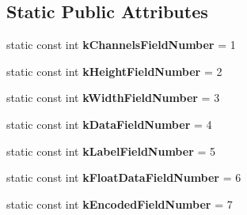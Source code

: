 \subsection*{Static Public Attributes}
\begin{DoxyCompactItemize}
\item 
\mbox{\label{classcaffe_1_1_datum_a29f5e8c5cb95724fb1acc9e653f9f801}} 
static const int {\bfseries k\+Channels\+Field\+Number} = 1
\item 
\mbox{\label{classcaffe_1_1_datum_a583d41a34b284174f56265bee590af02}} 
static const int {\bfseries k\+Height\+Field\+Number} = 2
\item 
\mbox{\label{classcaffe_1_1_datum_af711bbda0e62159d417a025955c80b19}} 
static const int {\bfseries k\+Width\+Field\+Number} = 3
\item 
\mbox{\label{classcaffe_1_1_datum_a9e15be20d26be0617c328e4bf1194deb}} 
static const int {\bfseries k\+Data\+Field\+Number} = 4
\item 
\mbox{\label{classcaffe_1_1_datum_ad2eb7414a6bd7b5c286fcdae87d55edd}} 
static const int {\bfseries k\+Label\+Field\+Number} = 5
\item 
\mbox{\label{classcaffe_1_1_datum_a230ea1f49b7e0383784fd4a0bc73dd78}} 
static const int {\bfseries k\+Float\+Data\+Field\+Number} = 6
\item 
\mbox{\label{classcaffe_1_1_datum_ab9447cc8853964074d3d7a9b10d031fc}} 
static const int {\bfseries k\+Encoded\+Field\+Number} = 7
\end{DoxyCompactItemize}
